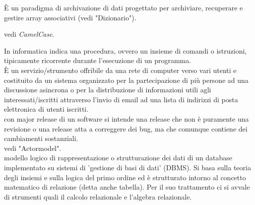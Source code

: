 \documentclass{scalatekids-article}
\begin{document}

   È un paradigma di archivazione di dati progettato per archiviare, recuperare e gestire array associativi (vedi "Dizionario").
  \\


   vedi \textit{CamelCase}.
  \\


   In informatica indica una procedura, ovvero un insieme di comandi o istruzioni, tipicamente ricorrente durante l'esecuzione di un programma.
  \\

   È un servizio/strumento offribile da una rete di computer verso vari utenti e costituito da un sistema organizzato per la partecipazione di più persone ad una discussione asincrona o per la distribuzione di informazioni utili agli interessati/iscritti attraverso l'invio di email ad una lista di indirizzi di posta elettronica di utenti iscritti.
  \\
  
   con major release di un software si intende una release che non è puramente una revisione o una release atta a correggere dei bug, ma che comunque contiene dei cambiamenti sostanziali.
  \\

   vedi "Actormodel".
  \\

   modello logico di rappresentazione o strutturazione dei dati di un database implementato su sistemi di 'gestione di basi di dati' (DBMS).
  Si basa sulla teoria degli insiemi e sulla logica del primo ordine ed è strutturato intorno al concetto matematico di relazione (detta anche tabella). Per il suo trattamento ci si avvale di strumenti quali il calcolo relazionale e l'algebra relazionale.
  \\

\end{document}
